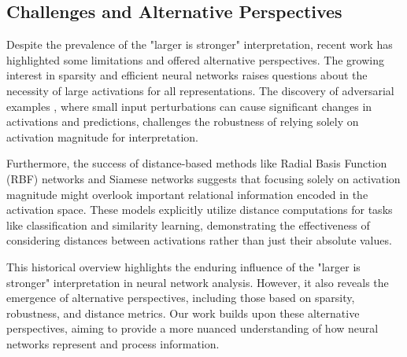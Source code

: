 \subsection{Challenges and Alternative Perspectives}

Despite the prevalence of the "larger is stronger" interpretation, recent work has highlighted some limitations and offered alternative perspectives. The growing interest in sparsity and efficient neural networks \cite{han2015learning, wang2020dynamic} raises questions about the necessity of large activations for all representations. The discovery of adversarial examples \cite{goodfellow2014explaining, madry2017towards}, where small input perturbations can cause significant changes in activations and predictions, challenges the robustness of relying solely on activation magnitude for interpretation.

Furthermore, the success of distance-based methods like Radial Basis Function (RBF) networks \cite{broomhead1988radial} and Siamese networks \cite{bromley1994signature, schroff2015facenet} suggests that focusing solely on activation magnitude might overlook important relational information encoded in the activation space. These models explicitly utilize distance computations for tasks like classification and similarity learning, demonstrating the effectiveness of considering distances between activations rather than just their absolute values.

This historical overview highlights the enduring influence of the "larger is stronger" interpretation in neural network analysis. However, it also reveals the emergence of alternative perspectives, including those based on sparsity, robustness, and distance metrics. Our work builds upon these alternative perspectives, aiming to provide a more nuanced understanding of how neural networks represent and process information.
